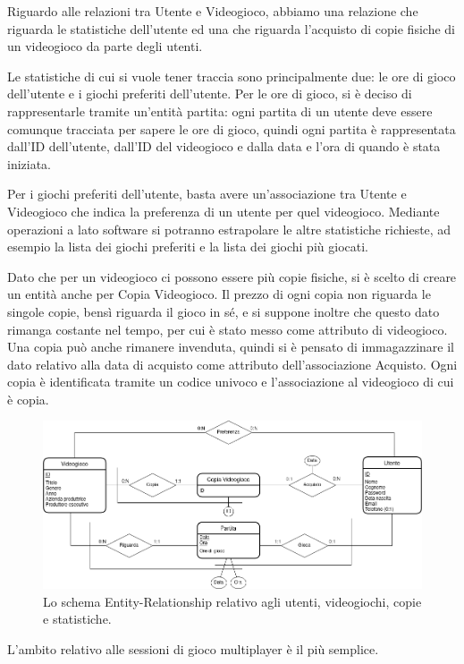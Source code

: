 \documentclass[a4paper,12pt]{report}
\begin{document}
Riguardo alle relazioni tra Utente e Videogioco, abbiamo una relazione che riguarda le statistiche dell'utente ed una che riguarda l'acquisto di copie fisiche di un videogioco da parte degli utenti.

Le statistiche di cui si vuole tener traccia sono principalmente due: le ore di gioco dell'utente e i giochi preferiti dell'utente. Per le ore di gioco, si è deciso di rappresentarle tramite un'entità partita: ogni partita di un utente deve essere comunque tracciata per sapere le ore di gioco, quindi ogni partita è rappresentata dall'ID dell'utente, dall'ID del videogioco e dalla data e l'ora di quando è stata iniziata.

Per i giochi preferiti dell'utente, basta avere un'associazione tra Utente e Videogioco che indica la preferenza di un utente per quel videogioco. Mediante operazioni a lato software si potranno estrapolare le altre statistiche richieste, ad esempio la lista dei giochi preferiti e la lista dei giochi più giocati.

Dato che per un videogioco ci possono essere più copie fisiche, si è scelto di creare un entità anche per Copia Videogioco. Il prezzo di ogni copia non riguarda le singole copie, bensì riguarda il gioco in sé, e si suppone inoltre che questo dato rimanga costante nel tempo, per cui è stato messo come attributo di videogioco. Una copia può anche rimanere invenduta, quindi si è pensato di immagazzinare il dato relativo alla data di acquisto come attributo dell'associazione Acquisto. Ogni copia è identificata tramite un codice univoco e l'associazione al videogioco di cui è copia.

\begin{figure}[!htb]
\includegraphics[width=\textwidth]{vg.png}
\caption{Lo schema Entity-Relationship relativo agli utenti, videogiochi, copie e statistiche.}
\label{img:schema_vg}
\end{figure}

L'ambito relativo alle sessioni di gioco multiplayer è il più semplice.
\end{document}
